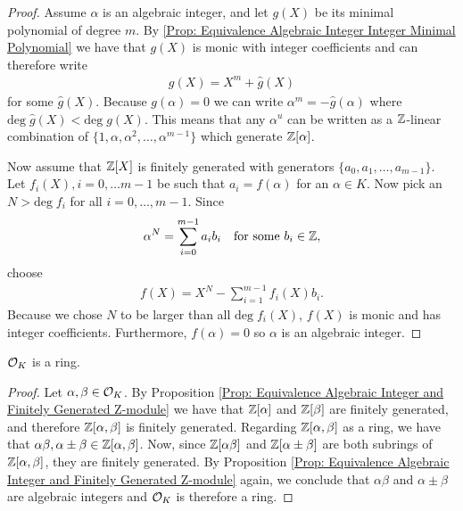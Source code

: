     \begin{proof}
        Assume \(\alpha\) is an algebraic integer, and let \(g(X)\) be its minimal polynomial of degree \(m\). By \ref{Prop: Equivalence Algebraic Integer Integer Minimal Polynomial} we have that \(g(X)\) is monic with integer coefficients and can therefore write
        \begin{align*}
            g(X) = X^m + \hat{g}(X)
        \end{align*}
        for some \(\hat{g}(X)\). Because \(g(\alpha) = 0\) we can write \(\alpha^m = -\hat{g}(\alpha)\) where \(\text{deg}\;\hat{g}(X) < \text{deg}\;g(X)\). This means that any \(\alpha^u\) can be written as a \(\mathbb{Z}\)-linear combination of \(\{1, \alpha, \alpha^2,\dots ,\alpha^{m-1}\}\) which generate \(\mathbb{Z}[\alpha]\).\par
        Now assume that \(\mathbb{Z}[X]\) is finitely generated with generators \(\{a_0, a_1,\dots ,a_{m - 1}\}\). Let \(f_i(X), i=0,\dots m-1\) be such that \(a_i = f(\alpha)\) for an \(\alpha\in K\). Now pick an \(N>\text{deg}\;f_i\) for all \(i=0,\dots ,m-1\). Since
        \begin{align*}
            \alpha^N = \sum\limits_{i= 0}^{m-1}a_ib_i\quad\text{for some }b_i\in\mathbb{Z},
        \end{align*}
        choose
        \begin{align*}
            f(X) = X^N - \sum\limits_{i = 1}^{m - 1}f_i(X)b_i.
        \end{align*}
        Because we chose \(N\) to be larger than all \(\text{deg}\;f_i(X)\), \(f(X)\) is monic and has integer coefficients. Furthermore, \(f(\alpha) = 0\) so \(\alpha\) is an algebraic integer.
        \end{proof}
        \begin{theorem}
        \(\mathcal{O}_K\) is a ring.
        \end{theorem}
        \begin{proof}
        Let \(\alpha, \beta \in \mathcal{O}_K\). By Proposition \ref{Prop: Equivalence Algebraic Integer and Finitely Generated Z-module} we have that \(\mathbb{Z}[\alpha]\) and \(\mathbb{Z}[\beta]\) are finitely generated, and therefore \(\mathbb{Z}[\alpha, \beta]\) is finitely generated. Regarding \(\mathbb{Z}[\alpha, \beta]\) as a ring, we have that \(\alpha\beta, \alpha\pm\beta\in\mathbb{Z}[\alpha, \beta]\). Now, since \(\mathbb{Z}[\alpha\beta]\) and \(\mathbb{Z}[\alpha\pm\beta]\) are both subrings of \(\mathbb{Z}[\alpha, \beta]\), they are finitely generated. By Proposition \ref{Prop: Equivalence Algebraic Integer and Finitely Generated Z-module} again, we conclude that \(\alpha\beta\) and \(\alpha\pm\beta\) are algebraic integers and \(\mathcal{O}_K\) is therefore a ring. 
    \end{proof}
